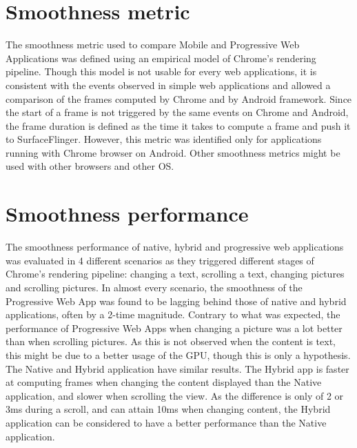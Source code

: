 \documentclass{kththesis}
\begin{document}

\section{Smoothness metric}
The smoothness metric used to compare Mobile and Progressive Web Applications was defined using an empirical model of Chrome's rendering pipeline. Though this model is not usable for every web applications, it is consistent with the events observed in simple web applications and allowed a comparison of the frames computed by Chrome and by Android framework. Since the start of a frame is not triggered by the same events on Chrome and Android, the frame duration is defined as the time it takes to compute a frame and push it to SurfaceFlinger. However, this metric was identified only for applications running with Chrome browser on Android. Other smoothness metrics might be used with other browsers and other OS. 

\section{Smoothness performance}
The smoothness performance of native, hybrid and progressive web applications was evaluated in 4 different scenarios as they triggered different stages of Chrome's rendering pipeline: changing a text, scrolling a text, changing pictures and scrolling pictures. In almost every scenario, the smoothness of the Progressive Web App was found to be lagging behind those of native and hybrid applications, often by a 2-time magnitude.\newline
Contrary to what was expected, the performance of Progressive Web Apps when changing a picture was a lot better than when scrolling pictures. As this is not observed when the content is text, this might be due to a better usage of the GPU, though this is only a hypothesis. \newline
The Native and Hybrid application have similar results. The Hybrid app is faster at computing frames when changing the content displayed than the Native application, and slower when scrolling the view. As the difference is only of 2 or 3ms during a scroll, and can attain 10ms when changing content, the Hybrid application can be considered to have a better performance than the Native application.
\end{document}
